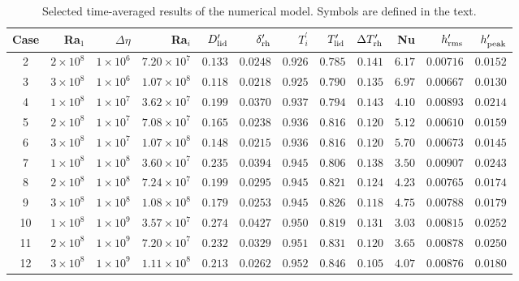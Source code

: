 \begin{table}[h!]
\centering
\caption{Selected time-averaged results of the numerical model. Symbols are defined in the text. \label{tab:aspect-out}}
\footnotesize
\begin{tabular}{@{} c r r r r r r r r r r r @{}}
\toprule
Case & Ra$_1$ & $\Delta \eta$ & Ra$_i$ & $D_{\rm lid}^\prime$ & $\delta_{\rm rh}^\prime$ & $T_i^\prime$ & $T_{\rm lid}^\prime$ & $\Delta T_{\rm rh}^\prime$ & Nu & $h_{\rm rms}^\prime$ & $h_{\rm peak}^\prime$  \\
\midrule

2 & $2 \times 10^{8}$ & $1 \times 10^{6}$ & $7.20 \times 10^{7}$ & $0.133$ & $0.0248$ & $0.926$ & $0.785$ & $0.141$ & $6.17$ & $0.00716$ & $0.0152$ \\
3 & $3 \times 10^{8}$ & $1 \times 10^{6}$ & $1.07 \times 10^{8}$ & $0.118$ & $0.0218$ & $0.925$ & $0.790$ & $0.135$ & $6.97$ & $0.00667$ & $0.0130$ \\
4 & $1 \times 10^{8}$ & $1 \times 10^{7}$ & $3.62 \times 10^{7}$ & $0.199$ & $0.0370$ & $0.937$ & $0.794$ & $0.143$ & $4.10$ & $0.00893$ & $0.0214$ \\
5 & $2 \times 10^{8}$ & $1 \times 10^{7}$ & $7.08 \times 10^{7}$ & $0.165$ & $0.0238$ & $0.936$ & $0.816$ & $0.120$ & $5.12$ & $0.00610$ & $0.0159$ \\
6 & $3 \times 10^{8}$ & $1 \times 10^{7}$ & $1.07 \times 10^{8}$ & $0.148$ & $0.0215$ & $0.936$ & $0.816$ & $0.120$ & $5.70$ & $0.00673$ & $0.0145$ \\
7 & $1 \times 10^{8}$ & $1 \times 10^{8}$ & $3.60 \times 10^{7}$ & $0.235$ & $0.0394$ & $0.945$ & $0.806$ & $0.138$ & $3.50$ & $0.00907$ & $0.0243$ \\
8 & $2 \times 10^{8}$ & $1 \times 10^{8}$ & $7.24 \times 10^{7}$ & $0.199$ & $0.0295$ & $0.945$ & $0.821$ & $0.124$ & $4.23$ & $0.00765$ & $0.0174$ \\
9 & $3 \times 10^{8}$ & $1 \times 10^{8}$ & $1.08 \times 10^{8}$ & $0.179$ & $0.0253$ & $0.945$ & $0.826$ & $0.118$ & $4.75$ & $0.00788$ & $0.0179$ \\
10 & $1 \times 10^{8}$ & $1 \times 10^{9}$ & $3.57 \times 10^{7}$ & $0.274$ & $0.0427$ & $0.950$ & $0.819$ & $0.131$ & $3.03$ & $0.00815$ & $0.0252$ \\
11 & $2 \times 10^{8}$ & $1 \times 10^{9}$ & $7.20 \times 10^{7}$ & $0.232$ & $0.0329$ & $0.951$ & $0.831$ & $0.120$ & $3.65$ & $0.00878$ & $0.0250$ \\
12 & $3 \times 10^{8}$ & $1 \times 10^{9}$ & $1.11 \times 10^{8}$ & $0.213$ & $0.0262$ & $0.952$ & $0.846$ & $0.105$ & $4.07$ & $0.00876$ & $0.0180$ \\






\bottomrule
\end{tabular}
\end{table}


